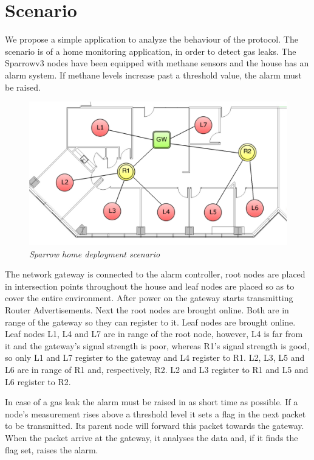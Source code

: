
\chapter{Scenario}

We propose a simple application to analyze the behaviour of the protocol. The
scenario is of a home monitoring application, in order to detect gas leaks.
The Sparrowv3 nodes have been equipped with methane sensors and the house has
an alarm system. If methane levels increase past a threshold value, the alarm
must be raised.

\begin{figure}[ht]
	\begin{center}
		\includegraphics[width=\textwidth]{img/scenario.pdf}
	\end{center}
	\caption{\small \itshape{Sparrow home deployment
	scenario\protect\footnotemark}}
\end{figure}

The network gateway is connected to the alarm controller, root nodes are placed
in intersection points throughout the house and leaf nodes are placed so as to
cover the entire environment. After power on the gateway starts transmitting
Router Advertisements. Next the root nodes are brought online. Both are in
range of the gateway so they can register to it. Leaf nodes are brought online.
Leaf nodes L1, L4 and L7 are in range of the root node, however, L4 is far from
it and the gateway's signal strength is poor, whereas R1's signal strength is
good, so only L1 and L7 register to the gateway and L4 register to R1. L2, L3,
L5 and L6 are in range of R1 and, respectively, R2. L2 and L3 register to R1
and L5 and L6 register to R2.

In case of a gas leak the alarm must be raised in as short time as possible.
If a node's measurement rises above a threshold level it sets a flag in the
next packet to be transmitted. Its parent node will forward this packet towards
the gateway. When the packet arrive at the gateway, it analyses the data and,
if it finds the flag set, raises the alarm.

